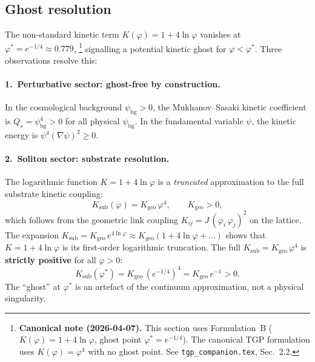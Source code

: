 \subsection{Ghost resolution}\label{ssec:ghost}

The non-standard kinetic term $K(\varphi)=1+4\ln\varphi$ vanishes
at $\varphi^{*}=e^{-1/4}\approx 0.779$,%
\footnote{{\bfseries Canonical note (2026-04-07).} This section uses Formulation~B ($K(\varphi)=1+4\ln\varphi$, ghost point $\varphi^*=e^{-1/4}$). The canonical TGP formulation uses $K(\varphi)=\varphi^4$ with no ghost point. See \texttt{tgp\_companion.tex}, Sec.~2.2.}
signalling a potential
kinetic ghost for $\varphi < \varphi^{*}$.  Three observations
resolve this:

\paragraph{1.\ Perturbative sector: ghost-free by construction.}
In the cosmological background $\psi_{\mathrm{bg}}>0$, the
Mukhanov--Sasaki kinetic coefficient is
$Q_{s}=\psi_{\mathrm{bg}}^{4}>0$ for all physical
$\psi_{\mathrm{bg}}$.  In the fundamental variable $\psi$,
the kinetic energy is $\psi^{4}(\nabla\psi)^{2}\geq 0$.

\paragraph{2.\ Soliton sector: substrate resolution.}
The logarithmic function $K=1+4\ln\varphi$ is a \emph{truncated}
approximation to the full substrate kinetic coupling:
\begin{equation}\label{eq:K-substrate}
  K_{\mathrm{sub}}(\varphi) = K_{\mathrm{geo}}\,\varphi^{4},
  \qquad K_{\mathrm{geo}} > 0,
\end{equation}
which follows from the geometric link coupling
$K_{ij}=J\,(\varphi_{i}\,\varphi_{j})^{2}$ on the lattice.
The expansion $K_{\mathrm{sub}}=K_{\mathrm{geo}}\,e^{4\ln\varphi}
\approx K_{\mathrm{geo}}(1+4\ln\varphi+\ldots)$ shows that
$K=1+4\ln\varphi$ is its first-order logarithmic truncation.
The full $K_{\mathrm{sub}}=K_{\mathrm{geo}}\,\varphi^{4}$
is \textbf{strictly positive} for all $\varphi>0$:
\begin{equation}
  K_{\mathrm{sub}}(\varphi^{*})
  = K_{\mathrm{geo}}\,(e^{-1/4})^{4}
  = K_{\mathrm{geo}}\,e^{-1} > 0.
\end{equation}
The ``ghost'' at $\varphi^{*}$ is an artefact of the continuum
approximation, not a physical singularity.

